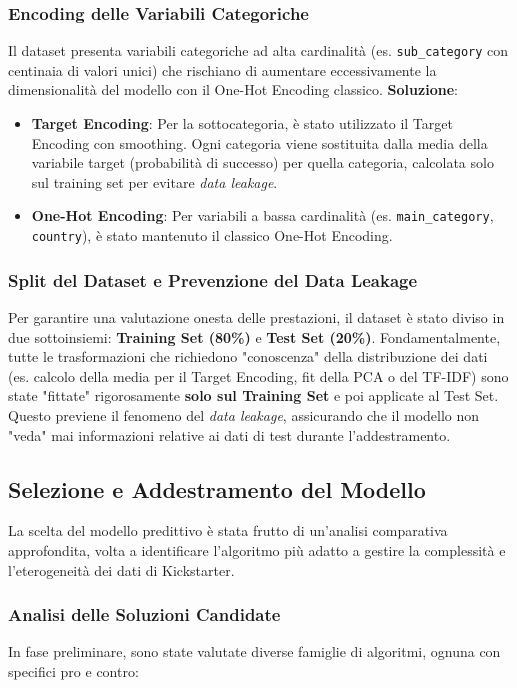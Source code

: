 \documentclass[a4paper,14pt]{extarticle}
\begin{document}
\subsubsection{Encoding delle Variabili Categoriche}
Il dataset presenta variabili categoriche ad alta cardinalità (es. \texttt{sub\_category} con centinaia di valori unici) che rischiano di aumentare eccessivamente la dimensionalità del modello con il One-Hot Encoding classico.
\textbf{Soluzione}:
\begin{itemize}
    \item \textbf{Target Encoding}: Per la sottocategoria, è stato utilizzato il Target Encoding con smoothing. Ogni categoria viene sostituita dalla media della variabile target (probabilità di successo) per quella categoria, calcolata solo sul training set per evitare \textit{data leakage}.
    \item \textbf{One-Hot Encoding}: Per variabili a bassa cardinalità (es. \texttt{main\_category}, \texttt{country}), è stato mantenuto il classico One-Hot Encoding.
\end{itemize}

\subsubsection{Split del Dataset e Prevenzione del Data Leakage}
Per garantire una valutazione onesta delle prestazioni, il dataset è stato diviso in due sottoinsiemi: \textbf{Training Set (80\%)} e \textbf{Test Set (20\%)}.
Fondamentalmente, tutte le trasformazioni che richiedono "conoscenza" della distribuzione dei dati (es. calcolo della media per il Target Encoding, fit della PCA o del TF-IDF) sono state "fittate" rigorosamente \textbf{solo sul Training Set} e poi applicate al Test Set. Questo previene il fenomeno del \textit{data leakage}, assicurando che il modello non "veda" mai informazioni relative ai dati di test durante l'addestramento.



\subsection{Selezione e Addestramento del Modello}
La scelta del modello predittivo è stata frutto di un'analisi comparativa approfondita, volta a identificare l'algoritmo più adatto a gestire la complessità e l'eterogeneità dei dati di Kickstarter.

\subsubsection{Analisi delle Soluzioni Candidate}
In fase preliminare, sono state valutate diverse famiglie di algoritmi, ognuna con specifici pro e contro:
\end{document}
